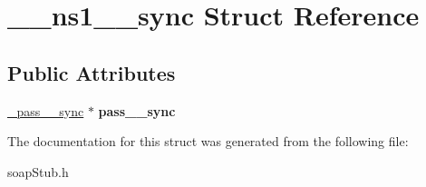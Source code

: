 \hypertarget{struct____ns1____sync}{
\section{\_\-\_\-ns1\_\-\_\-sync Struct Reference}
\label{struct____ns1____sync}
}
\subsection*{Public Attributes}
\begin{DoxyCompactItemize}
\item 
\hypertarget{struct____ns1____sync_a810e390ae267691daffe53fdcc131fff}{
\hyperlink{class__pass____sync}{\_\-pass\_\-\_\-sync} $\ast$ {\bfseries pass\_\-\_\-sync}}
\label{struct____ns1____sync_a810e390ae267691daffe53fdcc131fff}

\end{DoxyCompactItemize}


The documentation for this struct was generated from the following file:\begin{DoxyCompactItemize}
\item 
soapStub.h\end{DoxyCompactItemize}
